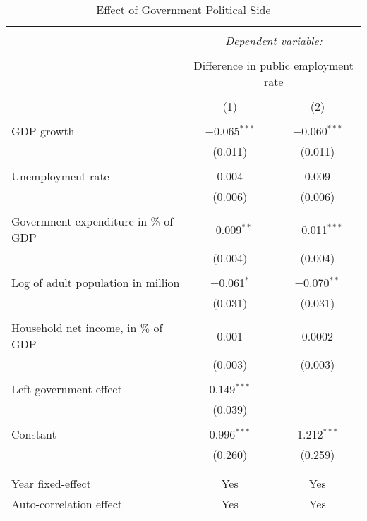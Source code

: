 
\begin{table}[!htbp] \centering 
  \caption{Effect of Government Political Side} 
  \label{} 
\begin{tabular}{@{\extracolsep{5pt}}lcc} 
\\[-1.8ex]\hline 
\hline \\[-1.8ex] 
 & \multicolumn{2}{c}{\textit{Dependent variable:}} \\ 
\cline{2-3} 
\\[-1.8ex] & \multicolumn{2}{c}{Difference in public employment rate} \\ 
\\[-1.8ex] & (1) & (2)\\ 
\hline \\[-1.8ex] 
 GDP growth & $-$0.065$^{***}$ & $-$0.060$^{***}$ \\ 
  & (0.011) & (0.011) \\ 
  & & \\ 
 Unemployment rate & 0.004 & 0.009 \\ 
  & (0.006) & (0.006) \\ 
  & & \\ 
 Government expenditure in \% of GDP & $-$0.009$^{**}$ & $-$0.011$^{***}$ \\ 
  & (0.004) & (0.004) \\ 
  & & \\ 
 Log of adult population in million & $-$0.061$^{*}$ & $-$0.070$^{**}$ \\ 
  & (0.031) & (0.031) \\ 
  & & \\ 
 Household net income, in \% of GDP & 0.001 & 0.0002 \\ 
  & (0.003) & (0.003) \\ 
  & & \\ 
 Left government effect & 0.149$^{***}$ &  \\ 
  & (0.039) &  \\ 
  & & \\ 
 Constant & 0.996$^{***}$ & 1.212$^{***}$ \\ 
  & (0.260) & (0.259) \\ 
  & & \\ 
\hline \\[-1.8ex] 
Year fixed-effect & Yes & Yes \\ 
Auto-correlation effect & Yes & Yes \\ 

\end{tabular}
\end{table}
